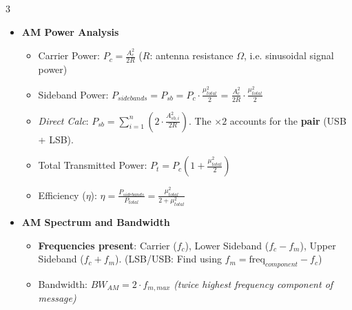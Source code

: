 \documentclass[a4paper, 9pt, landscape]{extarticle}
\begin{document}
\begin{multicols*}{3}
\begin{itemize}
\begin{itemize}
  \end{itemize}
  \item \textbf{AM Power Analysis}
    \begin{itemize}
      \item Carrier Power: $P_c = \frac{A_c^2}{2R}$ ($R$: antenna resistance $\Omega$, i.e. sinusoidal signal power)
      \item Sideband Power: $P_{sidebands} = P_{sb} = P_c \cdot \frac{\mu_{total}^2}{2}$ = $\frac{A_c^2}{2R} \cdot \frac{\mu_{total}^2}{2}$
      \item \textit{Direct Calc}: $P_{sb} = \sum_{i=1}^n \left( 2 \cdot \frac{A_{sb, i}^2}{2R} \right)$. The $\times 2$ accounts for the \textbf{pair} (USB + LSB).
      \item Total Transmitted Power: $\boxed{P_t = P_c \left(1 + \frac{\mu_{total}^2}{2}\right)}$
      \item Efficiency ($\eta$): $\eta = \frac{P_{sidebands}}{P_{total}} = \frac{\mu_{total}^2}{2 + \mu_{total}^2}$
    \end{itemize}

  \item \textbf{AM Spectrum and Bandwidth}
    \begin{itemize}
      \item \textbf{Frequencies present}: Carrier ($f_c$), Lower Sideband ($f_c - f_m$), Upper Sideband ($f_c + f_m$). (LSB/USB: Find using $f_m = \text{freq}_{component} - f_c$)
      \item Bandwidth: $\boxed{BW_{AM} = 2 \cdot f_{m,max}}$ \textit{(twice highest frequency component of message)}
    \end{itemize}
\end{itemize}

\columnbreak


\end{multicols*}
\end{document}
